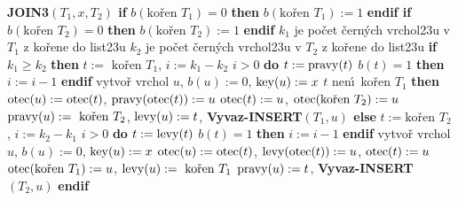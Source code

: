 {\bf JOIN3$(T_1,x,T_2)$\newline 
if} $b(\text{ko\v ren }T_1)=0$ {\bf then} $b(\text{ko\v ren }T_1)
:=1$ {\bf endif\newline 
if} $b(\text{ko\v ren }T_2)=0$ {\bf then} $b(\text{ko\v ren }T_2)
:=1$ {\bf endif}\newline 
$k_1$ je po\v cet \v cern\'ych vrchol\accent23u v $T_1$ z ko\v rene do list\accent23u \newline 
$k_2$ je po\v cet \v cern\'ych vrchol\accent23u v $T_2$ z ko\v rene do list\accent23u \newline 
{\bf if} $k_1\ge k_2$ {\bf then}\newline 
\phantom{---}$t:=\text{ ko\v ren }T_1$, $i:=k_1-k_2$ \newline 
\phantom{---}{\bf while} $i>0$ {\bf do}\newline 
\phantom{------}$t:=\operatorname{pravy}(t)$\newline 
\phantom{------}{\bf if} $b(t)=1$ {\bf then} $i:=i-1$ {\bf endif}\newline 
\phantom{---}{\bf enddo}\newline 
\phantom{---}vytvo\v r vrchol $u$, $b(u):=0$, $\operatorname{key}(u):=x$\newline 
\phantom{---}{\bf if} $t$ nen\'\i\ ko\v ren $T_1$ {\bf then}\newline 
\phantom{------}$\operatorname{otec}(u):=\operatorname{otec}(t)$, $\operatorname{pravy}(\operatorname{otec}(t)):=u$\newline 
\phantom{---}{\bf endif}\newline 
\phantom{---}$\operatorname{otec}(t):=u$, $\otec(\text{ko\v ren }T_2):=u$ \newline 
\phantom{---}$\pravy(u):=\text{ ko\v ren }T_2$, $\operatorname{levy}(u):=t$, {\bf Vyvaz-INSERT$(T_1,u)$\newline 
else}\newline 
\phantom{---}$t:=\text{ko\v ren }T_2$, $i:=k_2-k_1$ \newline 
\phantom{---}{\bf while} $i>0$ {\bf do}\newline 
\phantom{------}$t:=\operatorname{levy}(t)$\newline 
\phantom{------}{\bf if} $b(t)=1$ {\bf then} $i:=i-1$ {\bf endif}\newline 
\phantom{---}{\bf enddo}\newline 
\phantom{---}vytvo\v r vrchol $u$, $b(u):=0$, $\operatorname{key}(u):=x$ \newline 
\phantom{---}$\operatorname{otec}(u):=\operatorname{otec}(t)$, $\operatorname{levy}(\operatorname{otec}(t)):=u$, $\operatorname{otec}(t):=u$ \newline 
\phantom{---}$\otec(\text{ko\v ren }T_1):=u$, $\levy(u):=\text{ ko\v ren }T_1$ \newline 
\phantom{---}$\operatorname{pravy}(u):=t$, {\bf Vyvaz-INSERT}$(T_2,u)$\newline 
{\bf endif}
\medskip

